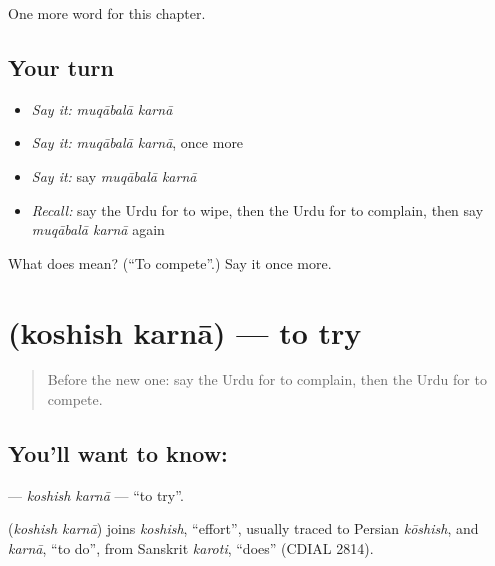 \begin{grammarlens}[title={What you've built}]
One more word for this chapter.
\end{grammarlens}

\subsection*{Your turn}
\begin{itemize}
\raggedright
  \item \emph{Say it:} \emph{muqābalā karnā}
  \item \emph{Say it:} \emph{muqābalā karnā}, once more
  \item \emph{Say it:} say \emph{muqābalā karnā}
  \item \emph{Recall:} say the Urdu for to wipe, then the Urdu for to complain, then say \emph{muqābalā karnā} again
\end{itemize}

\begin{tcolorbox}[breakable,colback=teal!4,colframe=teal!35!black,title={Before you move on}]
What does   mean? (\textquotedblleft{}To compete\textquotedblright{}.) Say it once more.
\end{tcolorbox}
\section[\texorpdfstring{\ur{کوشش} \ur{کرنا} (koshish karnā)}{کوشش کرنا (koshish karnā)}]{  (koshish karnā) — to try}

\label{lesson:UR-C242-koshish-karna}



\begin{quote}
Before the new one: say the Urdu for to complain, then the Urdu for to compete.
\end{quote}

\subsection*{You'll want to know:  }
\textbf{ } — \emph{koshish karnā} — \textquotedblleft{}to try\textquotedblright{}.

\begin{cousinweb}
\textbf{ } (\emph{koshish karnā}) joins \emph{koshish}, \textquotedblleft{}effort\textquotedblright{}, usually traced to Persian \emph{kōshish}, and \emph{karnā}, \textquotedblleft{}to do\textquotedblright{}, from Sanskrit \emph{karoti}, \textquotedblleft{}does\textquotedblright{} (CDIAL 2814).
\end{cousinweb}

